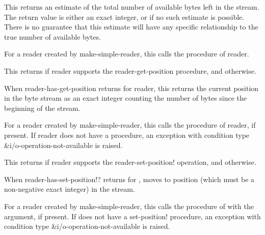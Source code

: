 \begin{entry}{%
}
   
This returns an estimate of the total number of available bytes left in the
stream. The return value is either an exact integer, or \schfalse{} if no such
estimate is possible. There is no guarantee that this estimate will have
any specific relationship to the true number of available bytes.
   
For a reader created by {\cf make-simple-reader}, this calls the 
procedure of reader.
\end{entry}   

\begin{entry}{%
}
   
This returns \schtrue{} if reader supports the reader-get-position
procedure, and \schfalse{} otherwise.
\end{entry}

\begin{entry}{%
}
   
When {\cf reader-has-get-position} returns \schtrue{} for reader, this
returns the current position in the byte stream as an exact integer
counting the number of bytes since the beginning of the stream.
   
For a reader created by {\cf make-simple-reader}, this calls the
 procedure of reader, if present. If reader does not
have a  procedure, an exception with condition type
{\cf\&i/o-operation-not-available} is raised.
\end{entry}

\begin{entry}{%
}
   
This returns \schtrue{} if reader supports the {\cf reader-set-position!} operation, and
\schfalse{} otherwise.
\end{entry}

\begin{entry}{%
}

When {\cf reader-has-set-position!?} returns \schtrue{} for
, moves to position  (which must be a non-negative
exact integer) in the stream.
 
For a reader created by {\cf make-simple-reader}, this calls the
  procedure of  with the 
argument, if present. If  does not have a set-position!
procedure, an {\cf exception} with condition type
{\cf\&i/o-operation-not-available} is raised.
\end{entry}

